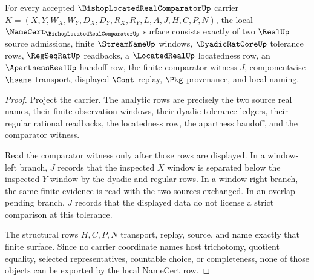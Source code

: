 \begin{theorem}
\label{thm:bishop-located-real-comparator-namecert-obligations}
For every accepted $\BishopLocatedRealComparatorUp$ carrier $K=(X,Y,W_X,W_Y,D_X,D_Y,R_X,R_Y,L,A,J,H,C,P,N)$, the local $\NameCert_{\BishopLocatedRealComparatorUp}$ surface consists exactly of two $\RealUp$ source admissions, finite $\StreamNameUp$ windows, $\DyadicRatCoreUp$ tolerance rows, $\RegSeqRatUp$ readbacks, a $\LocatedRealUp$ locatedness row, an $\ApartnessRealUp$ handoff row, the finite comparator witness $J$, componentwise $\hsame$ transport, displayed $\Cont$ replay, $\Pkg$ provenance, and local naming.
\end{theorem}
\begin{proof}
Project the carrier. The analytic rows are precisely the two source real names, their finite observation windows, their dyadic tolerance ledgers, their regular rational readbacks, the locatedness row, the apartness handoff, and the comparator witness.

Read the comparator witness only after those rows are displayed. In a window-left branch, $J$ records that the inspected $X$ window is separated below the inspected $Y$ window by the dyadic and regular rows. In a window-right branch, the same finite evidence is read with the two sources exchanged. In an overlap-pending branch, $J$ records that the displayed data do not license a strict comparison at this tolerance.

The structural rows $H,C,P,N$ transport, replay, source, and name exactly that finite surface. Since no carrier coordinate names host trichotomy, quotient equality, selected representatives, countable choice, or completeness, none of those objects can be exported by the local NameCert row.
\end{proof}

